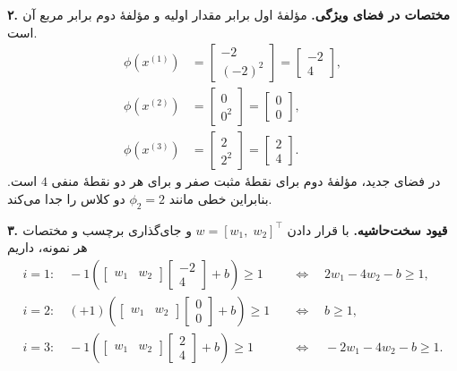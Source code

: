 \documentclass{article}
\numberwithin{equation}{section}
\numberwithin{table}{section}
\begin{document}
\noindent\textbf{۲. مختصات در فضای ویژگی.}
مؤلفهٔ اول برابر مقدار اولیه و مؤلفهٔ دوم برابر مربع آن است.
\begin{align*}
    \phi(x^{(1)})&=\begin{bmatrix}-2\\(-2)^2\end{bmatrix}
                    =\begin{bmatrix}-2\\4\end{bmatrix},\\
    \phi(x^{(2)})&=\begin{bmatrix}0\\0^2\end{bmatrix}
                    =\begin{bmatrix}0\\0\end{bmatrix},\\
    \phi(x^{(3)})&=\begin{bmatrix}2\\2^2\end{bmatrix}
                    =\begin{bmatrix}2\\4\end{bmatrix}.
\end{align*}
در فضای جدید، مؤلفهٔ دوم برای نقطهٔ مثبت صفر و برای هر دو نقطهٔ منفی \(4\) است. بنابراین خطی مانند \(\phi_2=2\) دو کلاس را جدا می‌کند.

\noindent\textbf{۳. قیود سخت‌حاشیه.}
با قرار دادن \(w=[w_1,\;w_2]^\top\) و جای‌گذاری برچسب و مختصات هر نمونه، داریم
\begin{align*}
    i=1:\quad -1\left(
      \begin{bmatrix}w_1&w_2\end{bmatrix}\begin{bmatrix}-2\\4\end{bmatrix}+b
    \right)\geq 1
    &\quad\Longleftrightarrow\quad 2w_1-4w_2-b\geq 1,\\
    i=2:\quad (+1)\left(
      \begin{bmatrix}w_1&w_2\end{bmatrix}\begin{bmatrix}0\\0\end{bmatrix}+b
    \right)\geq 1
    &\quad\Longleftrightarrow\quad b\geq 1,\\
    i=3:\quad -1\left(
      \begin{bmatrix}w_1&w_2\end{bmatrix}\begin{bmatrix}2\\4\end{bmatrix}+b
    \right)\geq 1
    &\quad\Longleftrightarrow\quad -2w_1-4w_2-b\geq 1.
\end{align*}
\end{document}
